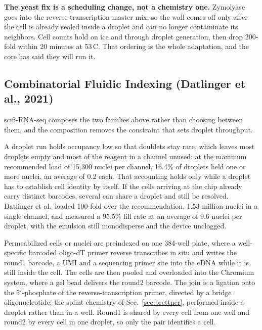 \begin{keybox}
\textbf{The yeast fix is a scheduling change, not a chemistry one.} Zymolyase
goes into the reverse-transcription master mix, so the wall comes off only after
the cell is already sealed inside a droplet and can no longer contaminate its
neighbors. Cell counts hold on ice and through droplet generation, then drop
200-fold within 20 minutes at 53\,\textdegree C. That ordering is the whole
adaptation, and the core has said they will run it.
\end{keybox}

\subsection{Combinatorial Fluidic Indexing (Datlinger et al., 2021)}
\label{sec:scifi}

scifi-RNA-seq \citep{datlingerUltrahighthroughputSinglecellRNA2021} composes the two
families above rather than choosing between them, and the composition removes the
constraint that sets droplet throughput.

 A droplet run holds occupancy low so that
doublets stay rare, which leaves most droplets empty and most of the reagent in a
channel unused: at the maximum recommended load of 15{,}300 nuclei per channel,
16.4\% of droplets held one or more nuclei, an average of 0.2 each. That accounting
holds only while a droplet has to establish cell identity by itself. If the cells
arriving at the chip already carry distinct barcodes, several can share a droplet and
still be resolved. Datlinger et al.\ loaded 100-fold over the recommendation,
1.53 million nuclei in a single channel, and measured a 95.5\% fill rate at an average
of 9.6 nuclei per droplet, with the emulsion still monodisperse and the device
unclogged.

 Permeabilized cells or nuclei are
preindexed on one 384-well plate, where a well-specific barcoded oligo-dT primer
reverse transcribes in situ and writes the round1 barcode, a UMI and a sequencing
primer site into the cDNA while it is still inside the cell. The cells are then pooled
and overloaded into the Chromium system, where a gel bead delivers the round2 barcode.
The join is a ligation onto the 5$'$-phosphate of the reverse-transcription primer,
directed by a bridge oligonucleotide: the splint chemistry of
Sec.~\ref{sec:brettner}, performed inside a droplet rather than in a well. Round1 is
shared by every cell from one well and round2 by every cell in one droplet, so only
the pair identifies a cell.

